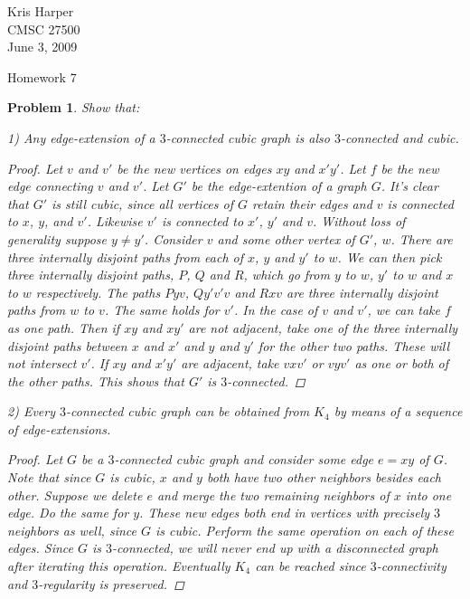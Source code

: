 \documentclass{article}
\newtheorem{problem}{Problem}
\begin{document}
\begin{flushright}
Kris Harper\\

CMSC 27500\\

June 3, 2009
\end{flushright}

\begin{center}
Homework 7
\end{center}

\begin{problem}
Show that:

1) Any edge-extension of a $3$-connected cubic graph is also $3$-connected and cubic.
\begin{proof}
Let $v$ and $v'$ be the new vertices on edges $xy$ and $x'y'$. Let $f$ be the new edge connecting $v$ and $v'$. Let $G'$ be the edge-extention of a graph $G$. It's clear that $G'$ is still cubic, since all vertices of $G$ retain their edges and $v$ is connected to $x$, $y$, and $v'$. Likewise $v'$ is connected to $x'$, $y'$ and $v$. Without loss of generality suppose $y \neq y'$. Consider $v$ and some other vertex of $G'$, $w$. There are three internally disjoint paths from each of $x$, $y$ and $y'$ to $w$. We can then pick three internally disjoint paths, $P$, $Q$ and $R$, which go from $y$ to $w$, $y'$ to $w$ and $x$ to $w$ respectively. The paths $Pyv$, $Qy'v'v$ and $Rxv$ are three internally disjoint paths from $w$ to $v$. The same holds for $v'$. In the case of $v$ and $v'$, we can take $f$ as one path. Then if $xy$ and $xy'$ are not adjacent, take one of the three internally disjoint paths between $x$ and $x'$ and $y$ and $y'$ for the other two paths. These will not intersect $v'$. If $xy$ and $x'y'$ are adjacent, take $vxv'$ or $vyv'$ as one or both of the other paths. This shows that $G'$ is $3$-connected.
\end{proof}
2) Every $3$-connected cubic graph can be obtained from $K_4$ by means of a sequence of edge-extensions.
\begin{proof}
Let $G$ be a $3$-connected cubic graph and consider some edge $e=xy$ of $G$. Note that since $G$ is cubic, $x$ and $y$ both have two other neighbors besides each other. Suppose we delete $e$ and merge the two remaining neighbors of $x$ into one edge. Do the same for $y$. These new edges both end in vertices with precisely $3$ neighbors as well, since $G$ is cubic. Perform the same operation on each of these edges. Since $G$ is $3$-connected, we will never end up with a disconnected graph after iterating this operation. Eventually $K_4$ can be reached since $3$-connectivity and $3$-regularity is preserved.

\end{proof}
\end{problem}
\end{document}
